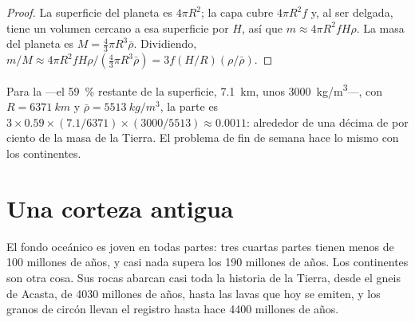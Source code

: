 \begin{proof}
La superficie del planeta es $4\pi R^2$; la capa cubre $4\pi R^2 f$ y, al
ser delgada, tiene un volumen cercano a esa superficie por $H$, así que $m \approx 4\pi R^2
f H \rho$. La masa del planeta es $M = \tfrac{4}{3}\pi R^3 \bar\rho$. Dividiendo,
$m/M \approx 4\pi R^2 f H \rho / (\tfrac{4}{3}\pi R^3 \bar\rho) = 3 f (H/R)
(\rho/\bar\rho)$.
\end{proof}

Para la  ---el \qty{59}{\percent} restante de la superficie,
\qty{7.1}{km}, unos \qty{3000}{kg/m^3}---, con $R = \qty{6371}{km}$ y
$\bar\rho = \qty{5513}{kg/m^3}$, la parte es $3 \times 0.59 \times
(7.1/6371) \times (3000/5513) \approx 0.0011$: alrededor de una décima de
por ciento de la masa de la Tierra. El problema de fin de semana hace lo mismo
con los continentes.

\section{Una corteza antigua}

El fondo oceánico es joven en todas partes: tres cuartas partes tienen menos
de 100 millones de años, y casi nada supera los 190 millones de años. Los
continentes son otra cosa. Sus rocas abarcan casi toda la historia de la
Tierra, desde el gneis de Acasta, de 4030 millones de años, hasta las lavas
que hoy se emiten, y los granos de circón llevan el registro hasta hace 4400
millones de años.

